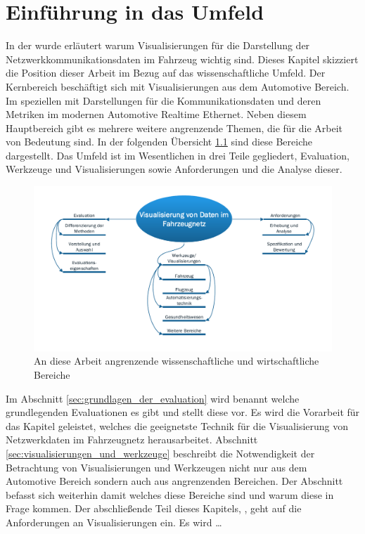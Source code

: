 \documentclass[draft=false
              ,paper=a4
              ,twoside=false
              ,fontsize=11pt
              ,headsepline
              ,BCOR10mm
              ,DIV11
              ]{scrbook}
\begin{document}
\chapter{Einführung in das Umfeld} %
\label{cha:umfeldanalyse}
In der  wurde erläutert warum Visualisierungen für die Darstellung der Netzwerkkommunikationsdaten im Fahrzeug wichtig sind. Dieses Kapitel skizziert die Position dieser Arbeit im Bezug auf das wissenschaftliche Umfeld. Der Kernbereich beschäftigt sich mit Visualisierungen aus dem Automotive Bereich. Im speziellen mit Darstellungen für die Kommunikationsdaten und deren Metriken im modernen Automotive Realtime Ethernet. Neben diesem Hauptbereich gibt es mehrere weitere angrenzende Themen, die für die Arbeit von Bedeutung sind. In der folgenden Übersicht \ref{fig:theme_overview} sind diese Bereiche dargestellt. Das Umfeld ist im Wesentlichen in drei Teile gegliedert, Evaluation, Werkzeuge und Visualisierungen sowie Anforderungen und die Analyse dieser. 

\begin{figure}[htbp]
  \centering
  \includegraphics[width=\textwidth]{img/theme_overview.pdf}
  \caption{An diese Arbeit angrenzende wissenschaftliche und wirtschaftliche Bereiche}
  \label{fig:theme_overview}
\end{figure}

Im Abschnitt \ref{sec:grundlagen_der_evaluation} wird benannt welche grundlegenden Evaluationen es gibt und stellt diese vor. Es wird die Vorarbeit für das Kapitel  geleistet, welches die geeignetste Technik für die Visualisierung von Netzwerkdaten im Fahrzeugnetz herausarbeitet. Abschnitt \ref{sec:visualisierungen_und_werkzeuge} beschreibt die Notwendigkeit der Betrachtung von Visualisierungen und Werkzeugen nicht nur aus dem Automotive Bereich sondern auch aus angrenzenden Bereichen. Der Abschnitt befasst sich weiterhin damit welches diese Bereiche sind und warum diese in Frage kommen. Der abschließende Teil dieses Kapitels, , geht auf die Anforderungen an Visualisierungen ein. Es wird \dots 
\end{document}
